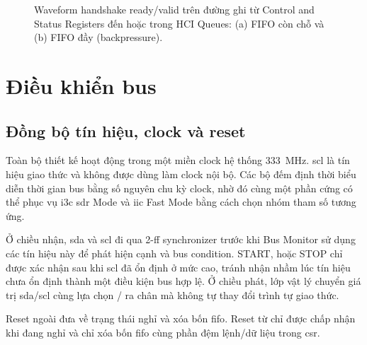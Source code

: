 \begin{figure}[!htbp]
	\centering
	
	\caption{Waveform handshake ready/valid trên đường ghi từ Control and Status Registers đến \CommandFifo{} hoặc \TxFifo{} trong HCI Queues: (a) FIFO còn chỗ và (b) FIFO đầy (backpressure).}
	\label{fig:csr-queue-handshake}
\end{figure}

\section{Điều khiển bus}
\label{sec:arch-datapath}

\subsection{Đồng bộ tín hiệu, clock và reset}
\label{sec:arch-clk}
\label{sec:rtl-phy}
\label{sec:rtl-monitor}

Toàn bộ thiết kế hoạt động trong một miền clock hệ thống 333~MHz. \gls{scl} là tín hiệu giao thức và không được dùng làm clock nội bộ. Các bộ đếm định thời biểu diễn thời gian bus bằng số nguyên chu kỳ clock, nhờ đó cùng một phần cứng có thể phục vụ \gls{i3c} \gls{sdr} Mode và \gls{iic} Fast Mode bằng cách chọn nhóm tham số tương ứng.

Ở chiều nhận, \gls{sda} và \gls{scl} đi qua 2-\gls{ff} synchronizer trước khi Bus Monitor sử dụng các tín
hiệu này để phát hiện cạnh và bus condition. START, \RepeatedSTART{} hoặc STOP chỉ được xác nhận
sau khi \gls{scl} đã ổn định ở mức cao, tránh nhận nhầm lúc tín hiệu chưa ổn định thành một điều kiện
bus hợp lệ. Ở chiều phát, lớp vật lý chuyển giá trị \gls{sda}/\gls{scl} cùng lựa chọn
\OpenDrain{}/\PushPull{} ra chân mà không tự thay đổi trình tự giao thức.

Reset ngoài đưa \Controller{} về trạng thái nghỉ và xóa bốn \gls{fifo}. Reset từ \Host{} chỉ được chấp nhận khi \Controller{} đang nghỉ và chỉ xóa bốn \gls{fifo} cùng phần đệm lệnh/dữ liệu trong \gls{csr}.

